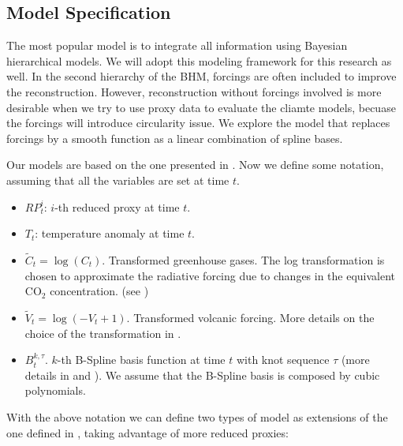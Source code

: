 \documentclass[11pt]{amsart}
\theoremstyle{plain}
\theoremstyle{definition}
\theoremstyle{remark}
\begin{document}
\subsection{Model Specification}
\label{sec:modelspec}
The most popular model is to integrate all information using Bayesian hierarchical models. We will adopt this modeling framework for this research as well. In the second hierarchy of the BHM, forcings are often included to improve the reconstruction. However, reconstruction without forcings involved is more desirable when we try to use proxy data to evaluate the cliamte models, becuase the forcings will introduce circularity issue. We explore the model that replaces forcings by a smooth function as a linear combination of spline bases.



Our models are based on the one presented in \cite{Barboza2014}. Now we define
some notation, assuming that all the variables are set at time $t$.
\begin{itemize}
\item $RP_t^i$: $i$-th reduced proxy at time $t$.
  
\item $T_t$: temperature anomaly at time $t$.
  
\item $\tilde C_t = \log (C_t)$. Transformed greenhouse gases. The log
  transformation is chosen to approximate the radiative forcing due to changes
  in the equivalent CO$_2$ concentration. (see \cite{Barboza2014})
  
\item $\tilde V_t = \log (-V_t+1)$. Transformed volcanic forcing. More details
  on the choice of the transformation in \cite{Barboza2014}.
  
\item $B_t^{k,\tau}$. $k$-th B-Spline basis function at time $t$ with knot
  sequence $\tau$ (more details in \cite{DeBoor2001} and \cite{Ramsay2005}). We assume that the
  B-Spline basis is composed by cubic polynomials.  
\end{itemize}
With the above notation we can define two types of model as extensions of the
one defined in \cite{Barboza2014}, taking advantage of more reduced proxies:
\end{document}
